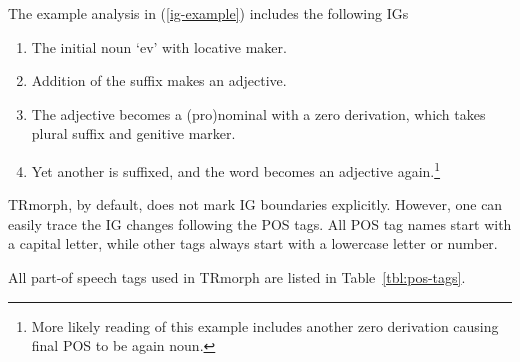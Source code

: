 \documentclass[twocolumn]{article}
\begin{document}

The example analysis in (\ref{ig-example}) includes the following IGs

\begin{enumerate}
\item The initial noun `ev' with locative maker.
\item Addition of the suffix  makes an adjective.
\item The adjective becomes a (pro)nominal with a zero derivation, which takes
plural suffix and genitive marker.
\item Yet another  is suffixed, and the word becomes an
adjective again.\footnote{More likely reading of this example
includes another zero derivation causing final POS to be again noun.}
\end{enumerate}

TRmorph, by default, does not mark IG boundaries explicitly. However,
one can easily trace the IG changes following the POS tags. All POS
tag names start with a capital letter, while other tags always start
with a lowercase letter or number.

All part-of speech tags used in TRmorph are listed in
Table~\ref{tbl:pos-tags}.
\end{document}
